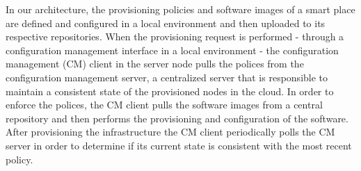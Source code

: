 In our architecture, the provisioning policies and software images of a smart place are defined and
configured in a local environment and then uploaded to its respective repositories. When the provisioning
request is performed - through a configuration management interface in a local environment - the
configuration management (CM) client in the server node pulls the polices from the configuration
management server, a centralized server that is responsible to maintain a consistent state of the
provisioned nodes in the cloud. In order to enforce the polices, the CM client pulls the software
images from a central repository and then performs the provisioning and configuration of the software.
After provisioning the infrastructure the CM client periodically polls the CM server in order to
determine if its current state is consistent with the most recent policy.
